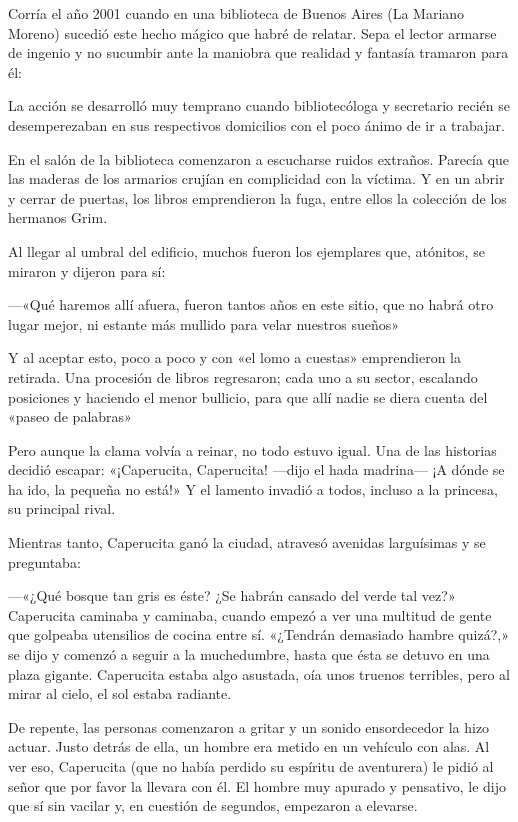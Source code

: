 \documentclass[11pt,twoside,openright,a5paper]{book}
\begin{document}
Corría el año 2001 cuando en una biblioteca de Buenos Aires (La Mariano Moreno) sucedió este hecho mágico que habré de relatar. Sepa el lector armarse de ingenio y no sucumbir ante la maniobra que realidad y fantasía tramaron para él:

La acción se desarrolló muy temprano cuando bibliotecóloga y secretario recién se desemperezaban en sus respectivos domicilios con el poco ánimo de ir a trabajar.

En el salón de la biblioteca comenzaron a escucharse ruidos extraños. Parecía que las maderas de los armarios crujían  en complicidad con la víctima. Y en un abrir y cerrar de puertas, los libros emprendieron la fuga, entre ellos la colección de los hermanos Grim.

Al llegar al umbral del edificio, muchos fueron los ejemplares que, atónitos, se miraron y dijeron para sí: 

---«Qué haremos allí afuera, fueron tantos años en este sitio, que no habrá otro lugar mejor, ni estante más mullido para velar nuestros sueños»

Y al aceptar esto, poco a poco y con «el lomo a cuestas» emprendieron la retirada. Una procesión de libros regresaron; cada uno a su sector, escalando posiciones y haciendo el menor bullicio, para que allí nadie se diera cuenta del «paseo de palabras» 

Pero aunque la clama volvía a reinar, no todo estuvo igual. Una de las historias decidió escapar: «¡Caperucita, Caperucita! ---dijo el hada madrina--- ¡A dónde se ha ido, la pequeña no está!» Y el lamento invadió a todos, incluso a la princesa, su principal rival.

Mientras tanto, Caperucita ganó la ciudad, atravesó avenidas larguísimas y se preguntaba:

---«¿Qué bosque tan gris es éste? ¿Se habrán cansado del verde tal vez?» Caperucita caminaba y caminaba, cuando empezó a ver una multitud de gente que golpeaba utensilios de cocina entre sí. «¿Tendrán demasiado hambre quizá?,» se dijo y comenzó a seguir a la muchedumbre, hasta que ésta se detuvo en una plaza gigante. Caperucita estaba algo asustada, oía unos truenos terribles, pero al mirar al cielo, el sol estaba radiante.

De repente, las personas comenzaron a gritar y un sonido ensordecedor la hizo actuar. Justo detrás de ella, un hombre era metido en un vehículo con alas. Al ver eso, Caperucita (que no había perdido su espíritu de aventurera) le pidió al señor que por favor la llevara con él. El hombre muy apurado y pensativo, le dijo que sí sin vacilar y, en cuestión de segundos, empezaron a elevarse.
\end{document}
